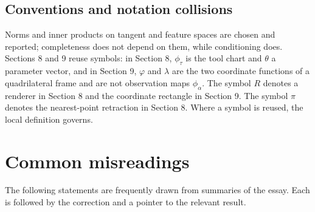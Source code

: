 \documentclass[11pt]{article}
\theoremstyle{remark}
\begin{document}
\subsection{Conventions and notation collisions}

Norms and inner products on tangent and feature spaces are chosen and reported; completeness does not depend on them, while conditioning does. Sections 8 and 9 reuse symbols: in Section 8, $\phi_\tau$ is the tool chart and $\theta$ a parameter vector, and in Section 9, $\varphi$ and $\lambda$ are the two coordinate functions of a quadrilateral frame and are not observation maps $\phi_\alpha$. The symbol $R$ denotes a renderer in Section 8 and the coordinate rectangle in Section 9. The symbol $\pi$ denotes the nearest-point retraction in Section 8. Where a symbol is reused, the local definition governs.

\section{Common misreadings}\label{sec:mis}

The following statements are frequently drawn from summaries of the essay. Each is followed by the correction and a pointer to the relevant result.
\end{document}
